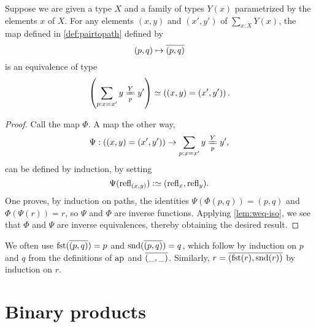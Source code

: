 \begin{lemma}\label{lem:isEq-pair=}
  Suppose we are given a type $X$ and a family of types $Y(x)$ parametrized by the elements $x$ of $X$.
  For any elements $(x,y)$ and $(x',y')$ of $\sum _{x:X} Y(x)$,
  the map defined in \cref{def:pairtopath} defined by
  \[
    (p,q) \mapsto \overline{({p},{q})}
  \]
  is an equivalence of type
  \[
    \left( \sum_{p:x=x'} \pathover y Y p {y'} \right)
    \weq \left ( (x,y) = (x',y') \right ).
  \]
\end{lemma}

\begin{proof}
  Call the map $\Phi$.
  A map the other way,
  \[
    \Psi : ((x,y) = (x',y')) \to \sum_{p:x=x'} \pathover y Y p {y'},
  \]
  can be defined by induction, by setting
  \[
    \Psi (\refl {(x,y)}) \defeq (\refl x, \refl y).
  \]
  One proves, by induction on paths, the identities $ \Psi ( \Phi (p,q) ) = (p,q) $ and $ \Phi (\Psi ( r )) = r$, so $\Psi$ and $\Phi$ are inverse functions.
  Applying \cref{lem:weq-iso}, we see that $\Phi$ and $\Psi$ are inverse equivalences, thereby obtaining the desired result.
\end{proof}

We often use $\fst(\pathpair p q) = p$ and $\snd(\pathpair p q) = q$,
which follow by induction on $p$ and $q$ from the definitions of $\ap{}$ and $\overline{({\_},{\_})}$.
Similarly, $r=\pathpair {\fst(r)}{\snd(r)}$ by induction on $r$.

\section{Binary products}
\label{sec:binprod-types}

